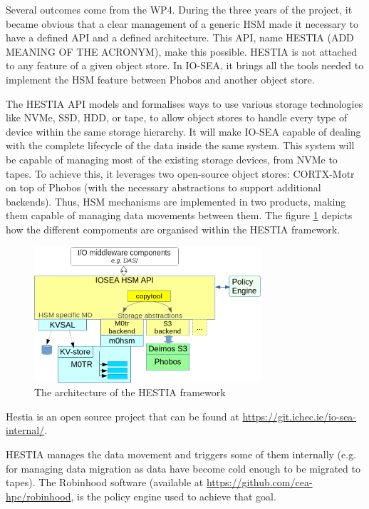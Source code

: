 Several outcomes come from the WP4. During the three years of the project, it became obvious that a clear 
management of a generic HSM made it necessary to have a defined API and a defined architecture. This API, name HESTIA (ADD MEANING OF THE ACRONYM), make this possible. HESTIA is not attached to any feature of a given object 
store. In IO-SEA, it brings all the tools needed to implement the HSM feature between Phobos and another object
store.

The HESTIA API models and formalises ways to use various storage technologies  like NVMe, SSD, HDD, or tape, to
allow object stores to handle every type of device within the same storage hierarchy. It will make IO-SEA 
capable of dealing with the complete lifecycle of the data inside the same system. This system will be capable of managing most of the existing storage devices, from NVMe to tapes. To achieve this, it leverages two open-source
object stores: CORTX-Motr on top of Phobos (with the necessary abstractions to support additional backends).
Thus, HSM mechanisms are implemented in two products, making them capable of managing data movements between
them. The figure \ref{fig:hestia} depicts how the different compoments are organised within the HESTIA 
framework. 

\begin{figure}[H]
    \centering
    \includegraphics[width=0.75\textwidth]{FIGS/hestia.png}
    \caption[HESTIA software architecture]{ The architecture of the HESTIA framework}
    \label{fig:hestia}
\end{figure}

Hestia is an open source project that can be found at \url{https://git.ichec.ie/io-sea-internal/}.

HESTIA manages the data movement and triggers some of them internally (e.g. for managing data migration as data
have become cold enough to be migrated to tapes). The Robinhood software (available at
\url{https://github.com/cea-hpc/robinhood}, is the policy engine used to achieve that goal. 

